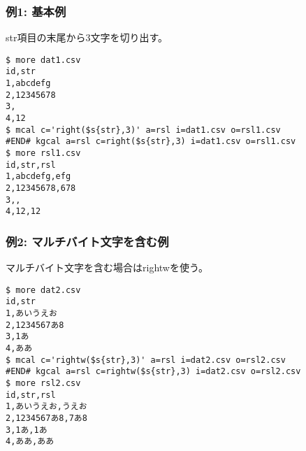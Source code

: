 \subsubsection*{例1: 基本例}

str項目の末尾から3文字を切り出す。


\begin{Verbatim}[baselinestretch=0.7,frame=single]
$ more dat1.csv
id,str
1,abcdefg
2,12345678
3,
4,12
$ mcal c='right($s{str},3)' a=rsl i=dat1.csv o=rsl1.csv
#END# kgcal a=rsl c=right($s{str},3) i=dat1.csv o=rsl1.csv
$ more rsl1.csv
id,str,rsl
1,abcdefg,efg
2,12345678,678
3,,
4,12,12
\end{Verbatim}
\subsubsection*{例2: マルチバイト文字を含む例}

マルチバイト文字を含む場合はrightwを使う。


\begin{Verbatim}[baselinestretch=0.7,frame=single]
$ more dat2.csv
id,str
1,あいうえお
2,1234567あ8
3,1あ
4,ああ
$ mcal c='rightw($s{str},3)' a=rsl i=dat2.csv o=rsl2.csv
#END# kgcal a=rsl c=rightw($s{str},3) i=dat2.csv o=rsl2.csv
$ more rsl2.csv
id,str,rsl
1,あいうえお,うえお
2,1234567あ8,7あ8
3,1あ,1あ
4,ああ,ああ
\end{Verbatim}
